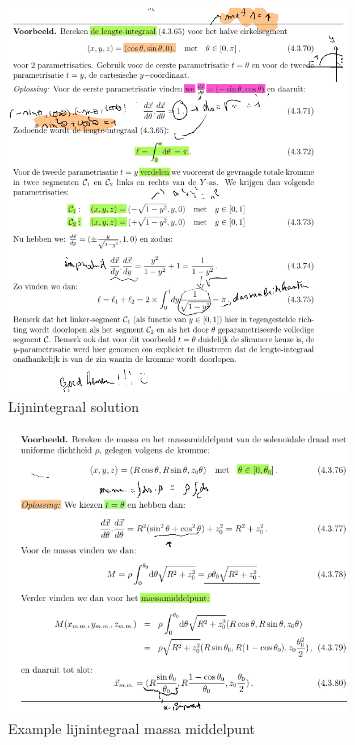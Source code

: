 \documentclass[a4paper]{article}
\begin{document}
\begin{figure}[H]
	\centering
	\includegraphics[width=0.8\textwidth]{assets/lijnintegraal_solution.png}
	\caption{Lijnintegraal solution}
	\label{fig:lijnintegraal_solution}
\end{figure}


\begin{figure}[H]
	\centering
	\includegraphics[width=0.8\textwidth]{assets/example_lijnintegraal_massa_middelpunt.png}
	\caption{Example lijnintegraal massa middelpunt}
	\label{fig:example_lijnintegraal_massa_middelpunt}
\end{figure}
\end{document}
